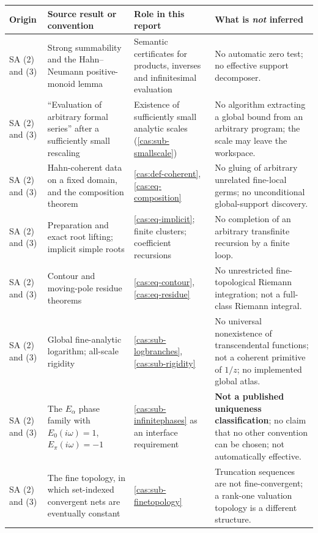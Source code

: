 \documentclass[11pt,letterpaper]{article}
\numberwithin{equation}{section}
\theoremstyle{definition}
\theoremstyle{remark}
\begin{document}
\begingroup\footnotesize
\begin{longtable}{@{}P{0.135\textwidth}P{0.265\textwidth}P{0.265\textwidth}P{0.25\textwidth}@{}}
\toprule
Origin & Source result or convention & Role in this report &
What is \emph{not} inferred\\
\midrule\endhead
SA (2) and (3) & Strong summability and the Hahn--Neumann positive-monoid lemma
& Semantic certificates for products, inverses and infinitesimal evaluation &
No automatic zero test; no effective support decomposer.\\[0.4em]
SA (2) and (3) & ``Evaluation of arbitrary formal series'' after a sufficiently
small rescaling & Existence of sufficiently small analytic scales
(\cref{cas:sub-smallscale}) & No algorithm extracting a global bound from an
arbitrary program; the scale may leave the workspace.\\[0.4em]
SA (2) and (3) & Hahn-coherent data on a fixed domain, and the composition
theorem & \cref{cas:def-coherent}, \eqref{cas:eq-composition} & No gluing of
arbitrary unrelated fine-local germs; no unconditional global-support
discovery.\\[0.4em]
SA (2) and (3) & Preparation and exact root lifting; implicit simple roots &
\eqref{cas:eq-implicit}; finite clusters; coefficient recursions & No completion
of an arbitrary transfinite recursion by a finite loop.\\[0.4em]
SA (2) and (3) & Contour and moving-pole residue theorems &
\eqref{cas:eq-contour}, \eqref{cas:eq-residue} & No unrestricted
fine-topological Riemann integration; not a full-class Riemann
integral.\\[0.4em]
SA (2) and (3) & Global fine-analytic logarithm; all-scale rigidity &
\cref{cas:sub-logbranches}, \cref{cas:sub-rigidity} & No universal nonexistence
of transcendental functions; not a coherent primitive of $1/z$; no implemented
global atlas.\\[0.4em]
SA (2) and (3) & The $E_\alpha$ phase family with
$E_0(i\omega)=1$, $E_\pi(i\omega)=-1$ & \cref{cas:sub-infinitephases} as an
interface requirement & \textbf{Not a published uniqueness classification}; no
claim that no other convention can be chosen; not automatically
effective.\\[0.4em]
SA (2) and (3) & The fine topology, in which set-indexed convergent nets are
eventually constant & \cref{cas:sub-finetopology} & Truncation sequences are not
fine-convergent; a rank-one valuation topology is a different
structure.\\[0.4em]

\end{longtable}
\end{document}
